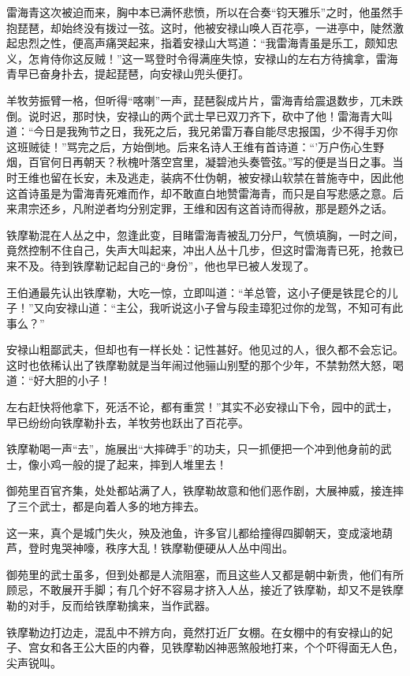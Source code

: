 \documentclass[12pt,oneside]{book}
\begin{document}
雷海青这次被迫而来，胸中本已满怀悲愤，所以在合奏``钧天雅乐''之时，他虽然手抱琵琶，却始终没有拨过一弦。这时，他被安禄山唤人百花亭，一进亭中，陡然激起忠烈之性，便高声痛哭起来，指着安禄山大骂道：``我雷海青虽是乐工，颇知忠义，怎肯侍你这反贼！''这一骂登时令得满座失惊，安禄山的左右方待擒拿，雷海青早已奋身扑去，提起琵琶，向安禄山兜头便打。

羊牧劳振臂一格，但听得``喀喇''一声，琵琶裂成片片，雷海青给震退数步，兀未跌倒。说时迟，那时快，安禄山的两个武士早已双刀齐下，砍中了他！雷海青大叫道：``今日是我殉节之日，我死之后，我兄弟雷万春自能尽忠报国，少不得手刃你这班贼徒！''骂完之后，方始倒地。后来名诗人王维有首诗道：``'万户伤心生野烟，百官何日再朝天？秋槐叶落空宫里，凝碧池头奏管弦。''写的便是当日之事。当时王维也留在长安，未及逃走，装病不仕伪朝，被安禄山软禁在普施寺中，因此他这首诗虽是为雷海青死难而作，却不敢直白地赞雷海青，而只是自写悲感之意。后来肃宗还乡，凡附逆者均分别定罪，王维和因有这首诗而得赦，那是题外之话。

铁摩勒混在人丛之中，忽逢此变，目睹雷海青被乱刀分尸，气愤填胸，一时之间，竟然控制不住自己，失声大叫起来，冲出人丛十几步，但这时雷海青已死，抢救已来不及。待到铁摩勒记起自己的``身份''，他也早已被人发现了。

王伯通最先认出铁摩勒，大吃一惊，立即叫道：``羊总管，这小子便是铁昆仑的儿子！''又向安禄山道：``主公，我听说这小子曾与段圭璋犯过你的龙驾，不知可有此事么？''

安禄山粗鄙武夫，但却也有一样长处：记性甚好。他见过的人，很久都不会忘记。这时也依稀认出了铁摩勒就是当年闹过他骊山别墅的那个少年，不禁勃然大怒，喝道：``好大胆的小子！

左右赶快将他拿下，死活不论，都有重赏！''其实不必安禄山下令，园中的武士，早已纷纷向铁摩勒扑去，羊牧劳也跃出了百花亭。

铁摩勒喝一声``去''，施展出``大摔碑手''的功夫，只一抓便把一个冲到他身前的武士，像小鸡一般的提了起来，摔到人堆里去！

御苑里百官齐集，处处都站满了人，铁摩勒故意和他们恶作剧，大展神威，接连摔了三个武士，都是向着人多的地方摔去。

这一来，真个是城门失火，殃及池鱼，许多官儿都给撞得四脚朝天，变成滚地葫芦，登时鬼哭神嚎，秩序大乱！铁摩勒便硬从人丛中闯出。

御苑里的武士虽多，但到处都是人流阻塞，而且这些人又都是朝中新贵，他们有所顾忌，不敢展开手脚；有几个好不容易才挤入人丛，接近了铁摩勒，却又不是铁摩勒的对手，反而给铁摩勒擒来，当作武器。

铁摩勒边打边走，混乱中不辨方向，竟然打近厂女棚。在女棚中的有安禄山的妃子、宫女和各王公大臣的内眷，见铁摩勒凶神恶煞般地打来，个个吓得面无人色，尖声锐叫。
\end{document}
